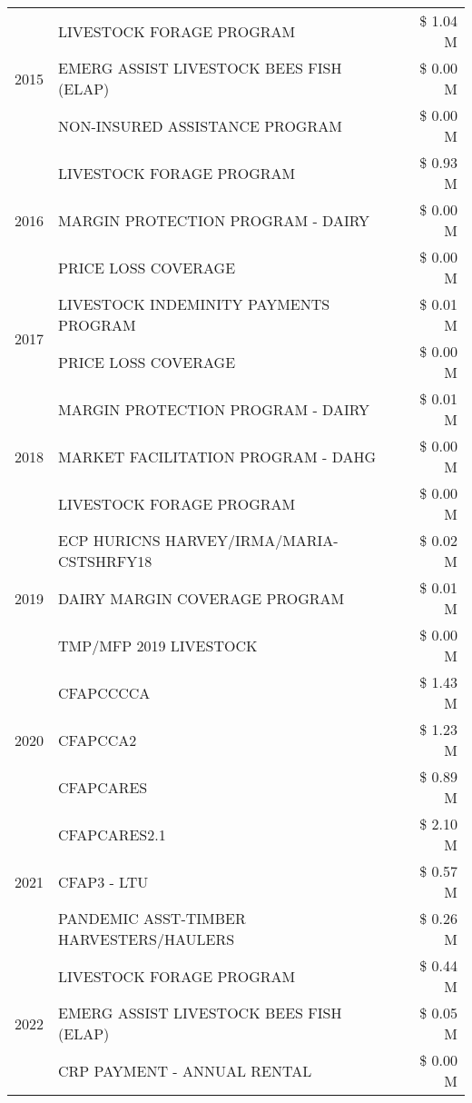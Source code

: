 \begin{tabular}{llr}
\cline{1-3}
\multirow[t]{3}{*}{2015} & LIVESTOCK FORAGE PROGRAM & \$ 1.04 M \\
 & EMERG ASSIST LIVESTOCK BEES FISH (ELAP) & \$ 0.00 M \\
 & NON-INSURED ASSISTANCE PROGRAM & \$ 0.00 M \\
\cline{1-3}
\multirow[t]{3}{*}{2016} & LIVESTOCK FORAGE PROGRAM & \$ 0.93 M \\
 & MARGIN PROTECTION PROGRAM - DAIRY & \$ 0.00 M \\
 & PRICE LOSS COVERAGE & \$ 0.00 M \\
\cline{1-3}
\multirow[t]{2}{*}{2017} & LIVESTOCK INDEMINITY PAYMENTS PROGRAM & \$ 0.01 M \\
 & PRICE LOSS COVERAGE & \$ 0.00 M \\
\cline{1-3}
\multirow[t]{3}{*}{2018} & MARGIN PROTECTION PROGRAM - DAIRY & \$ 0.01 M \\
 & MARKET FACILITATION PROGRAM - DAHG & \$ 0.00 M \\
 & LIVESTOCK FORAGE PROGRAM & \$ 0.00 M \\
\cline{1-3}
\multirow[t]{3}{*}{2019} & ECP HURICNS HARVEY/IRMA/MARIA-CSTSHRFY18 & \$ 0.02 M \\
 & DAIRY MARGIN COVERAGE PROGRAM & \$ 0.01 M \\
 & TMP/MFP 2019 LIVESTOCK & \$ 0.00 M \\
\cline{1-3}
\multirow[t]{3}{*}{2020} & CFAPCCCCA & \$ 1.43 M \\
 & CFAPCCA2 & \$ 1.23 M \\
 & CFAPCARES & \$ 0.89 M \\
\cline{1-3}
\multirow[t]{3}{*}{2021} & CFAPCARES2.1 & \$ 2.10 M \\
 & CFAP3 - LTU & \$ 0.57 M \\
 & PANDEMIC ASST-TIMBER HARVESTERS/HAULERS & \$ 0.26 M \\
\cline{1-3}
\multirow[t]{3}{*}{2022} & LIVESTOCK FORAGE PROGRAM & \$ 0.44 M \\
 & EMERG ASSIST LIVESTOCK BEES FISH (ELAP) & \$ 0.05 M \\
 & CRP PAYMENT - ANNUAL RENTAL & \$ 0.00 M \\
\cline{1-3}
\bottomrule
\end{tabular}

